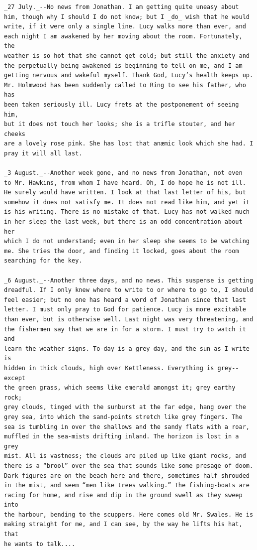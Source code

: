 \documentclass{article}
\begin{document}
\begin{verbatim}
_27 July._--No news from Jonathan. I am getting quite uneasy about
him, though why I should I do not know; but I _do_ wish that he would
write, if it were only a single line. Lucy walks more than ever, and
each night I am awakened by her moving about the room. Fortunately, the
weather is so hot that she cannot get cold; but still the anxiety and
the perpetually being awakened is beginning to tell on me, and I am
getting nervous and wakeful myself. Thank God, Lucy’s health keeps up.
Mr. Holmwood has been suddenly called to Ring to see his father, who has
been taken seriously ill. Lucy frets at the postponement of seeing him,
but it does not touch her looks; she is a trifle stouter, and her cheeks
are a lovely rose pink. She has lost that anæmic look which she had. I
pray it will all last.

_3 August._--Another week gone, and no news from Jonathan, not even
to Mr. Hawkins, from whom I have heard. Oh, I do hope he is not ill.
He surely would have written. I look at that last letter of his, but
somehow it does not satisfy me. It does not read like him, and yet it
is his writing. There is no mistake of that. Lucy has not walked much
in her sleep the last week, but there is an odd concentration about her
which I do not understand; even in her sleep she seems to be watching
me. She tries the door, and finding it locked, goes about the room
searching for the key.

_6 August._--Another three days, and no news. This suspense is getting
dreadful. If I only knew where to write to or where to go to, I should
feel easier; but no one has heard a word of Jonathan since that last
letter. I must only pray to God for patience. Lucy is more excitable
than ever, but is otherwise well. Last night was very threatening, and
the fishermen say that we are in for a storm. I must try to watch it and
learn the weather signs. To-day is a grey day, and the sun as I write is
hidden in thick clouds, high over Kettleness. Everything is grey--except
the green grass, which seems like emerald amongst it; grey earthy rock;
grey clouds, tinged with the sunburst at the far edge, hang over the
grey sea, into which the sand-points stretch like grey fingers. The
sea is tumbling in over the shallows and the sandy flats with a roar,
muffled in the sea-mists drifting inland. The horizon is lost in a grey
mist. All is vastness; the clouds are piled up like giant rocks, and
there is a “brool” over the sea that sounds like some presage of doom.
Dark figures are on the beach here and there, sometimes half shrouded
in the mist, and seem “men like trees walking.” The fishing-boats are
racing for home, and rise and dip in the ground swell as they sweep into
the harbour, bending to the scuppers. Here comes old Mr. Swales. He is
making straight for me, and I can see, by the way he lifts his hat, that
he wants to talk....


\end{verbatim}
\end{document}
